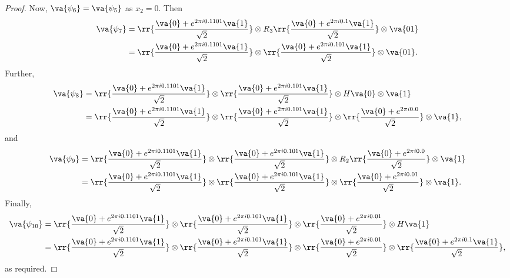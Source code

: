 \documentclass{article}
\begin{document}
\begin{claim*}[a]
\begin{proof}
    Now, $\va{\psi_6}=\va{\psi_5}$ as $x_2=0$. Then
    \begin{align*}
      \va{\psi_7}
      &= \rr{\frac{\va{0}+e^{2\pi i 0.1101}\va{1}}{\sqrt{2}}}
      \otimes R_3\rr{\frac{\va{0}+e^{2\pi i 0.1}\va{1}}{\sqrt{2}}}
      \otimes \va{01} \\
      &= \rr{\frac{\va{0}+e^{2\pi i 0.1101}\va{1}}{\sqrt{2}}}
      \otimes \rr{\frac{\va{0}+e^{2\pi i 0.101}\va{1}}{\sqrt{2}}}
      \otimes \va{01}.
    \end{align*}
    Further,
    \begin{align*}
      \va{\psi_8}
      &= \rr{\frac{\va{0}+e^{2\pi i 0.1101}\va{1}}{\sqrt{2}}}\otimes
      \rr{\frac{\va{0}+e^{2\pi i 0.101}\va{1}}{\sqrt{2}}} \otimes H\va{0} \otimes \va{1}\\
      &= \rr{\frac{\va{0}+e^{2\pi i 0.1101}\va{1}}{\sqrt{2}}}
      \otimes \rr{\frac{\va{0}+e^{2\pi i 0.101}\va{1}}{\sqrt{2}}}
      \otimes \rr{\frac{\va{0}+e^{2\pi i 0.0}}{\sqrt{2}}}
      \otimes \va{1},
    \end{align*}
    and
    \begin{align*}
      \va{\psi_9}
      &= \rr{\frac{\va{0}+e^{2\pi i 0.1101}\va{1}}{\sqrt{2}}}
      \otimes \rr{\frac{\va{0}+e^{2\pi i 0.101}\va{1}}{\sqrt{2}}}
      \otimes R_2\rr{\frac{\va{0}+e^{2\pi i 0.0}}{\sqrt{2}}}
      \otimes \va{1} \\
      &= \rr{\frac{\va{0}+e^{2\pi i 0.1101}\va{1}}{\sqrt{2}}}
      \otimes \rr{\frac{\va{0}+e^{2\pi i 0.101}\va{1}}{\sqrt{2}}}
      \otimes \rr{\frac{\va{0}+e^{2\pi i 0.01}}{\sqrt{2}}}
      \otimes \va{1}.
    \end{align*}
    Finally,
    \begin{align*}
      \va{\psi_{10}}
      &= \rr{\frac{\va{0}+e^{2\pi i 0.1101}\va{1}}{\sqrt{2}}}
      \otimes \rr{\frac{\va{0}+e^{2\pi i 0.101}\va{1}}{\sqrt{2}}}
      \otimes \rr{\frac{\va{0}+e^{2\pi i 0.01}}{\sqrt{2}}}
      \otimes H\va{1}\\
      &= \rr{\frac{\va{0}+e^{2\pi i 0.1101}\va{1}}{\sqrt{2}}}
      \otimes \rr{\frac{\va{0}+e^{2\pi i 0.101}\va{1}}{\sqrt{2}}}
      \otimes \rr{\frac{\va{0}+e^{2\pi i 0.01}}{\sqrt{2}}}
      \otimes \rr{\frac{\va{0}+e^{2\pi i 0.1}\va{1}}{\sqrt{2}}},
    \end{align*}
    as required.
  \end{proof}
\end{claim*}
\end{document}
